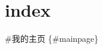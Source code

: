 \chapter{index }
\hypertarget{md_docs_2zh_2md_2index}{}\label{md_docs_2zh_2md_2index}
\#我的主页 \{\#mainpage\} 